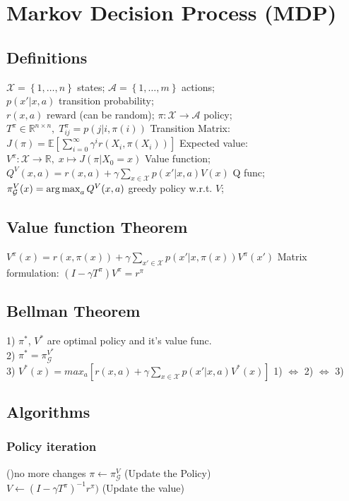 \section{Markov Decision Process (MDP)}
\subsection{Definitions}
$\mathcal{X}=\left\{1,\dots,n\right\}$ states; 
$\mathcal{A}=\left\{1,\dots,m\right\}$ actions;\\
$p(x'\vert x, a)$ transition probability;\\
$r(x,a)$ reward {\tiny(can be random)}; 
$\pi:\mathcal{X}\rightarrow\mathcal{A}$ policy;\\
$T^\pi\in\mathbb{R}^{n\times n},\; T^\pi_{ij} = p(j\vert i, \pi(i))$ Transition Matrix:\\
$J(\pi) = \mathbb{E}\left[\sum_{i=0}^{\infty}\gamma^i r(X_i, \pi(X_i))\right]$ Expected value:\\
$V^\pi:\mathcal{X}\rightarrow \mathbb{R},\; x\mapsto J(\pi\vert X_0 = x)$ Value function;\\
$Q^V(x,a) = r(x,a) + \gamma\sum_{x\in\mathcal{X}}p(x'\vert x, a)V(x)$ Q func;\\
$\pi_\mathcal{G}^{V}(x)=\operatorname*{arg\,max}_a Q^V(x,a)$ greedy policy {\scriptsize w.r.t. $V$};

\subsection{Value function Theorem}
$V^\pi(x) = r(x,\pi(x))+\gamma\sum_{x'\in\mathcal{X}}p(x'\vert x, \pi(x))V^\pi(x')$
Matrix formulation: $(I-\gamma T^\pi)V^\pi=r^\pi$

\subsection{Bellman Theorem}
1) $\pi^*$, $V^*$ are optimal policy and it's value func.\\
2) $\pi^* = \pi_\mathcal{G}^{V^*}$\\
3) $V^*(x)=max_a\left[r(x,a)+\gamma\sum_{x\in\mathcal{X}}p(x'\vert x, a)V^*(x)\right]$
1) $\Leftrightarrow$ 2) $\Leftrightarrow$ 3)

\subsection{Algorithms}
\subsubsection{Policy iteration}
\begin{algorithm}[H]
    \While(){no more changes}{
        $\pi \gets \pi_\mathcal{G}^{V}$ (Update the Policy)\\
        $V \gets (I-\gamma T^\pi)^{-1}r^\pi)$ (Update the value)
    }
\end{algorithm}

